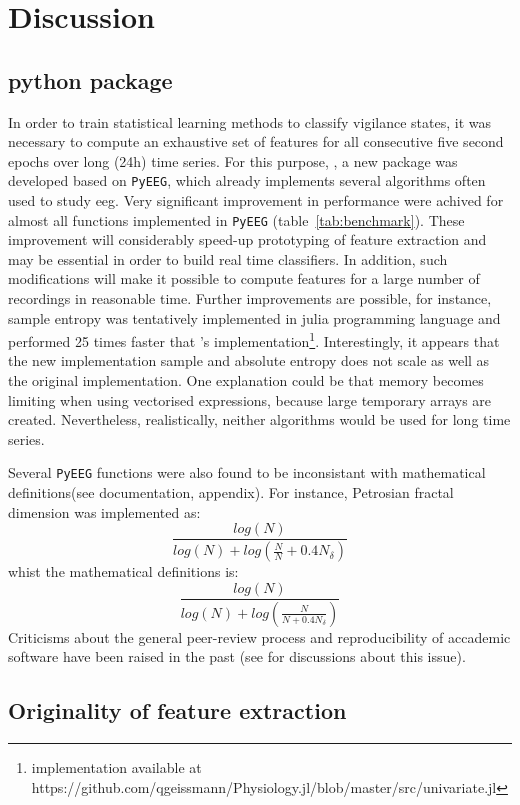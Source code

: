 \section{Discussion} \label{discussion}

\subsection{python package}
 
In order to train statistical learning methods to classify vigilance states, 
it was necessary to compute an exhaustive set of features for all consecutive five second epochs
over long (24h) time series.
For this purpose, \pr{}, a new \py{} package was developed based on
\texttt{PyEEG}\citationneeded{},  which already implements several algorithms often used to study \gls{eeg}.
Very significant improvement in performance were achived for almost all functions implemented in \texttt{PyEEG}
(table~\ref{tab:benchmark}). These improvement will considerably speed-up prototyping of feature extraction
and may be essential in order to build real time classifiers. 
In addition, such modifications will make it possible to compute features for a large number
of recordings in reasonable time.
Further improvements are possible, for instance, 
sample entropy was tentatively implemented in julia programming language and performed 25 times faster that
\pr{}'s implementation\footnote{implementation available at 
https://github.com/qgeissmann/Physiology.jl/blob/master/src/univariate.jl}.
Interestingly, it appears that the new implementation sample and 
absolute entropy does not scale as well as the original implementation.
One explanation could be that memory becomes limiting when using vectorised expressions, because large temporary arrays are created.
Nevertheless, realistically, neither algorithms would be used for long time series.

Several \texttt{PyEEG} functions were also found to be inconsistant with mathematical
definitions(see \pr{} documentation, appendix).
For instance, Petrosian fractal dimension \citationneeded{} was implemented as:
\[
\frac{log(N)}{log(N) + log(\frac{N}{N}+0.4N_{\delta})}
\]
whist the mathematical definitions is:
\[
\frac{log(N)}{log(N) + log(\frac{N}{N+0.4N_{\delta}})}
\]
Criticisms about the general peer-review process and reproducibility of accademic software 
have been raised in the past (see  for discussions about this issue).

\subsection{Originality of feature extraction}

